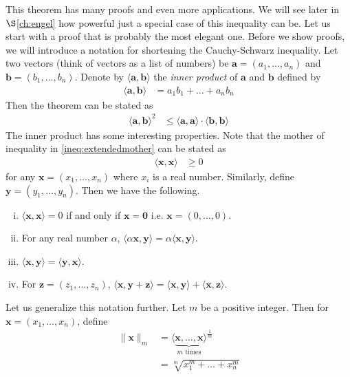 \documentclass{subfile}
\begin{document}
	This theorem has many proofs and even more applications. We will see later in \hyperref[ch:engel]{$\S$\ref{ch:engel}} how powerful just a special case of this inequality can be. Let us start with a proof that is probably the most elegant one. Before we show proofs, we will introduce a notation for shortening the Cauchy-Schwarz inequality. Let two vectors (think of vectors as a list of numbers) be $\mathbf{a}=(a_1,\ldots,a_n)$ and $\mathbf{b}=(b_1,\ldots,b_n)$. Denote by $\langle \mathbf{a},\mathbf{b}\rangle$ the \emph{inner product} of $\mathbf{a}$ and $\mathbf{b}$ defined by
		\begin{align*}
			\langle \mathbf{a},\mathbf{b}\rangle
				& = a_1b_1+\ldots+a_nb_n
		\end{align*}
	Then the theorem can be stated as
		\begin{align*}
			\langle \mathbf{a},\mathbf{b}\rangle^2
				& \leq\langle\mathbf{a},\mathbf{a}\rangle\cdot\langle\mathbf{b},\mathbf{b}\rangle
		\end{align*}
	The inner product has some interesting properties. Note that the mother of inequality in \ref{ineq:extendedmother} can be  stated as
		\begin{align*}
			\langle\mathbf{x},\mathbf{x}\rangle
				& \geq0
		\end{align*}
	for any $\mathbf{x}=(x_1,\ldots,x_n)$ where $x_i$ is a real number. Similarly, define $\mathbf{y}=(y_1,\ldots,y_n)$. Then we have the following.
		\begin{enumerate}[(i)]\label{list:innerprops}
			\item $\langle\mathbf{x},\mathbf{x}\rangle=0$ if and only if $\mathbf{x}=\mathbf{0}$ i.e. $\mathbf{x}=(0,\ldots,0)$.
			\item For any real number $\alpha$, $\langle\alpha\mathbf{x},\mathbf{y}\rangle=\alpha\langle\mathbf{x},\mathbf{y}\rangle$.
			\item $\langle\mathbf{x},\mathbf{y}\rangle=\langle\mathbf{y},\mathbf{x}\rangle$.
			\item For $\mathbf{z}=(z_1,\ldots,z_n)$, $\langle\mathbf{x},\mathbf{y}+\mathbf{z}\rangle=\langle\mathbf{x},\mathbf{y}\rangle+\langle\mathbf{x},\mathbf{z}\rangle$.
		\end{enumerate}
	Let us generalize this notation further. Let $m$ be a positive integer. Then for $\mathbf{x}=(x_1,\ldots,x_n)$, define
		\begin{align*}
			\| \mathbf{x}\| _m
				& = \langle\underbrace{\mathbf{x},\ldots,\mathbf{x}}_{m\mbox{ times}}\rangle^{\frac{1}{m}}\\
				& = \sqrt[m]{x_1^m+\ldots+x_n^m}
		\end{align*}
\end{document}
